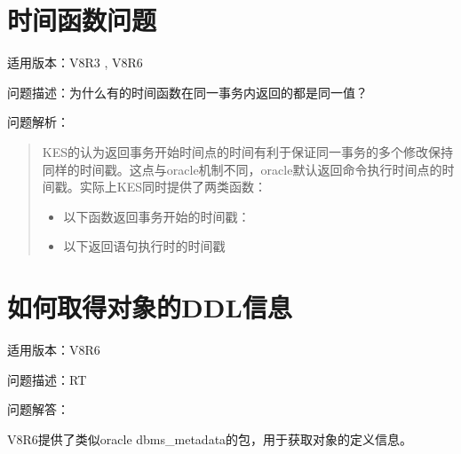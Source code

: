 \documentclass[letterpaper,10pt,english]{sphinxmanual}
\begin{document}
\section{时间函数问题}
\label{\detokenize{sql:id21}}
适用版本：V8R3 , V8R6

问题描述：为什么有的时间函数在同一事务内返回的都是同一值？

问题解析：
\begin{quote}

KES的认为返回事务开始时间点的时间有利于保证同一事务的多个修改保持同样的时间戳。这点与oracle机制不同，oracle默认返回命令执行时间点的时间戳。实际上KES同时提供了两类函数：
\begin{itemize}
\item {} 
以下函数返回事务开始的时间戳：

\end{itemize}
\begin{quote}

\begin{sphinxVerbatim}[commandchars=\\\{\}]
\end{sphinxVerbatim}
\end{quote}
\begin{itemize}
\item {} 
以下返回语句执行时的时间戳

\end{itemize}
\begin{quote}

\begin{sphinxVerbatim}[commandchars=\\\{\}]
\end{sphinxVerbatim}
\end{quote}
\end{quote}


\section{如何取得对象的DDL信息}
\label{\detokenize{sql:ddl}}
适用版本：V8R6

问题描述：RT

问题解答：

V8R6提供了类似oracle dbms\_metadata的包，用于获取对象的定义信息。
\end{document}
